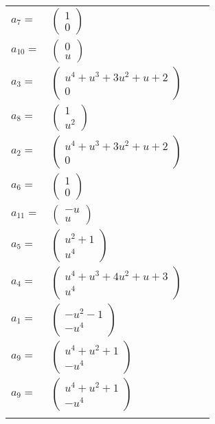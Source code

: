 \documentclass[1p]{elsarticle_modified}
\theoremstyle{definition}
\begin{document}
\begin{tabular}{m{7pt} m{180pt} m{7pt} m{180pt} }
\flushright $a_{7}=$&$\begin{pmatrix}1\\0\end{pmatrix}$ \\
\flushright $a_{10}=$&$\begin{pmatrix}0\\u\end{pmatrix}$ \\
\flushright $a_{3}=$&$\begin{pmatrix}u^4+u^3+3 u^2+u+2\\0\end{pmatrix}$ \\
\flushright $a_{8}=$&$\begin{pmatrix}1\\u^2\end{pmatrix}$ \\
\flushright $a_{2}=$&$\begin{pmatrix}u^4+u^3+3 u^2+u+2\\0\end{pmatrix}$ \\
\flushright $a_{6}=$&$\begin{pmatrix}1\\0\end{pmatrix}$ \\
\flushright $a_{11}=$&$\begin{pmatrix}- u\\u\end{pmatrix}$ \\
\flushright $a_{5}=$&$\begin{pmatrix}u^2+1\\u^4\end{pmatrix}$ \\
\flushright $a_{4}=$&$\begin{pmatrix}u^4+u^3+4 u^2+u+3\\u^4\end{pmatrix}$ \\
\flushright $a_{1}=$&$\begin{pmatrix}- u^2-1\\- u^4\end{pmatrix}$ \\
\flushright $a_{9}=$&$\begin{pmatrix}u^4+u^2+1\\- u^4\end{pmatrix}$\\ \flushright $a_{9}=$&$\begin{pmatrix}u^4+u^2+1\\- u^4\end{pmatrix}$\\&\end{tabular}
\end{document}

